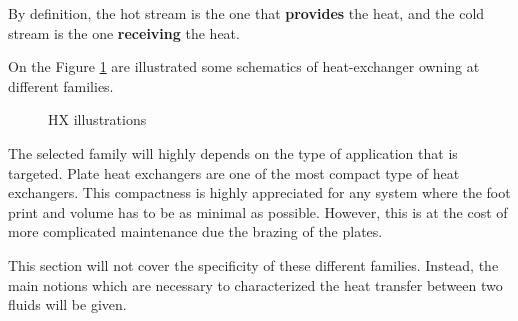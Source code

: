 By definition, the hot stream is the one that \textbf{provides} the heat, and the cold stream is the one \textbf{receiving} the heat.

On the Figure \ref{fig:C3_HX} are illustrated some schematics of heat-exchanger owning at different families.
\begin{figure}[h]
\centering
{}\hfill
{}\hfill
{}
\caption{HX illustrations} \label{fig:C3_HX}
\end{figure}

The selected family will highly depends on the type of application that is targeted. Plate heat exchangers are one of the most compact type of heat exchangers. This compactness is highly appreciated for any system where the foot print and volume has to be as minimal as possible. However, this is at the cost of more complicated maintenance due the brazing of the plates.

This section will not cover the specificity of these different families. Instead, the main notions which are necessary to characterized the heat transfer between two fluids will be given.


